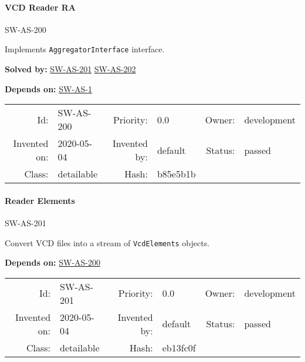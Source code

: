\paragraph{VCD Reader RA}

\hypertarget{SW-AS-200}{SW-AS-200} 
\label{SW-AS-200}

Implements \texttt{AggregatorInterface} interface.





 \textbf{Solved by:}
 \hyperlink{SW-AS-201}{SW-AS-201}  \hyperlink{SW-AS-202}{SW-AS-202} 


 \textbf{Depends on:}
 \hyperlink{SW-AS-1}{SW-AS-1} 




\par{\small \begin{center}
\begin{tabular}{rlrlrl}
   Id: & SW-AS-200               & Priority: & 0.0          & Owner: & development \\
   Invented on: & 2020-05-04 & Invented by: & default & Status: & passed \\
   Class: & detailable & Hash: & b85e5b1b
\end{tabular}\end{center}
}

\paragraph{Reader Elements}

\hypertarget{SW-AS-201}{SW-AS-201} 
\label{SW-AS-201}

Convert VCD files into a stream of \texttt{VcdElements} objects.







 \textbf{Depends on:}
 \hyperlink{SW-AS-200}{SW-AS-200} 




\par{\small \begin{center}
\begin{tabular}{rlrlrl}
   Id: & SW-AS-201               & Priority: & 0.0          & Owner: & development \\
   Invented on: & 2020-05-04 & Invented by: & default & Status: & passed \\
   Class: & detailable & Hash: & eb13fc0f
\end{tabular}\end{center}
}

